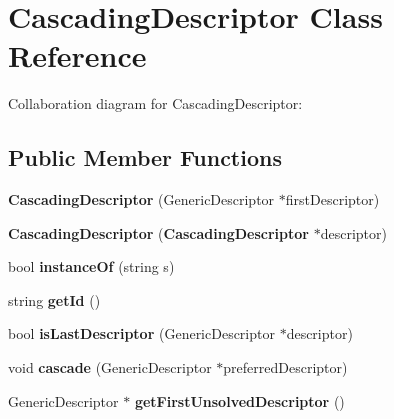 \section{CascadingDescriptor Class Reference}
\label{classbr_1_1pucrio_1_1telemidia_1_1ginga_1_1ncl_1_1model_1_1presentation_1_1CascadingDescriptor}
Collaboration diagram for CascadingDescriptor:\subsection*{Public Member Functions}
\begin{CompactItemize}
\item 
\textbf{CascadingDescriptor} (GenericDescriptor $\ast$firstDescriptor)\label{classbr_1_1pucrio_1_1telemidia_1_1ginga_1_1ncl_1_1model_1_1presentation_1_1CascadingDescriptor_ea72e8e13e9bf74160d1056ccb77991c}

\item 
\textbf{CascadingDescriptor} ({\bf CascadingDescriptor} $\ast$descriptor)\label{classbr_1_1pucrio_1_1telemidia_1_1ginga_1_1ncl_1_1model_1_1presentation_1_1CascadingDescriptor_72bb1f08823468c9e9ca070f3b08cd5c}

\item 
bool \textbf{instanceOf} (string s)\label{classbr_1_1pucrio_1_1telemidia_1_1ginga_1_1ncl_1_1model_1_1presentation_1_1CascadingDescriptor_4081cb1ebb5adebc1d0858ff6f69af0d}

\item 
string \textbf{getId} ()\label{classbr_1_1pucrio_1_1telemidia_1_1ginga_1_1ncl_1_1model_1_1presentation_1_1CascadingDescriptor_bba5652b12c4d6161f860eb44d5789d8}

\item 
bool \textbf{isLastDescriptor} (GenericDescriptor $\ast$descriptor)\label{classbr_1_1pucrio_1_1telemidia_1_1ginga_1_1ncl_1_1model_1_1presentation_1_1CascadingDescriptor_45fffea043e543bdb34d9831a40161f0}

\item 
void \textbf{cascade} (GenericDescriptor $\ast$preferredDescriptor)\label{classbr_1_1pucrio_1_1telemidia_1_1ginga_1_1ncl_1_1model_1_1presentation_1_1CascadingDescriptor_5d4fd47b60f2780205bd330c371fe4bf}

\item 
GenericDescriptor $\ast$ \textbf{getFirstUnsolvedDescriptor} ()\label{classbr_1_1pucrio_1_1telemidia_1_1ginga_1_1ncl_1_1model_1_1presentation_1_1CascadingDescriptor_eb761bb60216a32aa037870cf5100705}


\end{CompactItemize}
